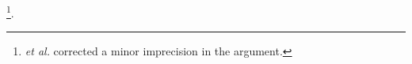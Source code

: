 \footnote{
   \emph{et al.} \cite{article:FoucartACHA2009} corrected
  a minor imprecision in
  the argument.
}.

